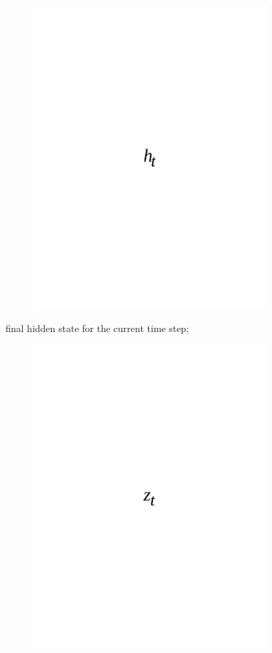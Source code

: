 \begin{figure}[H]
	\centering
	\includegraphics[width=0.8\textwidth]{media/ict/image77}
	\caption*{}
\end{figure}

final hidden state for the current time step;
\begin{figure}[H]
	\centering
	\includegraphics[width=0.8\textwidth]{media/ict/image78}
	\caption*{}
\end{figure}

